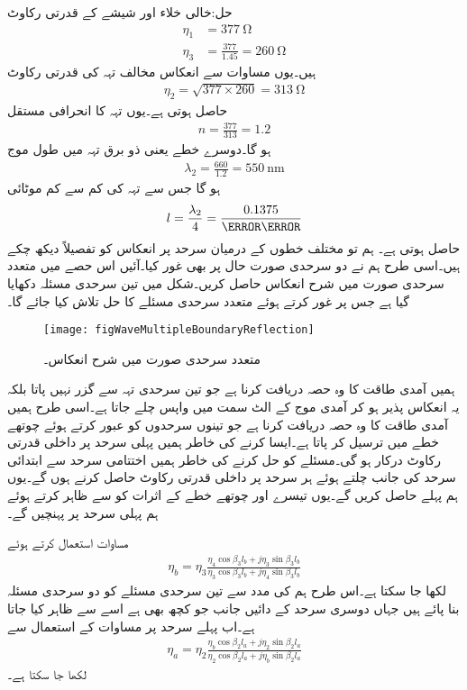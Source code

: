 حل:خالی خلاء اور شیشے کے قدرتی رکاوٹ
\begin{align*}
\eta_1&=\SI{377}{\ohm}\\
\eta_3&=\frac{377}{1.45}=\SI{260}{\ohm}
\end{align*}
ہیں۔یوں مساوات  سے انعکاس مخالف تہہ کی قدرتی رکاوٹ
\begin{align*}
\eta_2=\sqrt{377 \times 260}=\SI{313}{\ohm}
\end{align*}
حاصل ہوتی ہے۔یوں تہہ کا انحرافی مستقل
\begin{align*}
n=\frac{377}{313}=1.2
\end{align*}
ہو گا۔دوسرے خطے یعنی ذو برق تہہ میں طول موج
\begin{align*}
\lambda_2=\frac{660}{1.2}=\SI{550}{\nano\meter}
\end{align*}
ہو گا جس سے تہہ کی کم سے کم موٹائی
\begin{align*}
l=\frac{\lambda_2}{4}=\frac{0.1375}{\micro\meter}
\end{align*}
حاصل ہوتی ہے۔
ہم تو مختلف خطوں کے درمیان سرحد پر انعکاس کو تفصیلاً دیکھ چکے ہیں۔اسی طرح ہم نے دو سرحدی صورت حال پر بھی غور کیا۔آئیں اس حصے میں متعدد سرحدی صورت میں شرح انعکاس حاصل کریں۔شکل  میں تین سرحدی مسئلہ دکھایا گیا ہے جس پر غور کرتے ہوئے متعدد سرحدی مسئلے کا حل تلاش کیا جائے گا۔

\begin{figure}
\centering
\texttt{[image: figWaveMultipleBoundaryReflection]}
\caption{متعدد سرحدی صورت میں شرح انعکاس۔}
\label{شکل_مستوی_متعدد_سرحدی_شرح_انعکاس}
\end{figure}

ہمیں آمدی طاقت کا وہ حصہ دریافت کرنا ہے جو تین سرحدی تہہ سے گزر نہیں پاتا بلکہ یہ انعکاس پذیر ہو کر آمدی موج کے الٹ سمت میں واپس چلے جاتا ہے۔اسی طرح ہمیں آمدی طاقت کا وہ حصہ دریافت کرنا ہے جو تینوں سرحدوں کو عبور کرتے ہوئے چوتھے خطے میں ترسیل کر پاتا ہے۔ایسا کرنے کی خاطر ہمیں پہلی سرحد پر داخلی قدرتی رکاوٹ   درکار ہو گی۔مسئلے کو حل کرنے کی خاطر ہمیں اختتامی سرحد سے ابتدائی سرحد کی جانب چلتے ہوئے  ہر سرحد پر داخلی قدرتی رکاوٹ حاصل کرنے ہوں گے۔یوں ہم پہلے  حاصل کریں گے۔یوں تیسرے اور چوتھے خطے کے اثرات کو  سے ظاہر کرتے ہوئے ہم پہلی سرحد پر پہنچیں گے۔

مساوات  استعمال کرتے ہوئے
\begin{align}
\eta_{b}= \eta_3 \frac{\eta_4 \cos \beta_3 l_b +j \eta_3 \sin \beta_3 l_b}{\eta_3 \cos \beta_3 l_b +j \eta_4\sin \beta_3 l_b}
\end{align}
لکھا جا سکتا ہے۔اس طرح ہم  کی مدد سے تین سرحدی مسئلے کو دو سرحدی مسئلہ بنا پائے ہیں جہاں دوسری سرحد کے دائیں جانب جو کچھ بھی ہے اسے  سے ظاہر کیا جاتا ہے۔اب پہلے سرحد پر مساوات  کے استعمال سے
 \begin{align}
\eta_{a}= \eta_2 \frac{\eta_b \cos \beta_2 l_a +j \eta_2 \sin \beta_2 l_a}{\eta_2 \cos \beta_2 l_a +j \eta_b\sin \beta_2 l_a}
\end{align}
لکھا جا سکتا ہے۔

